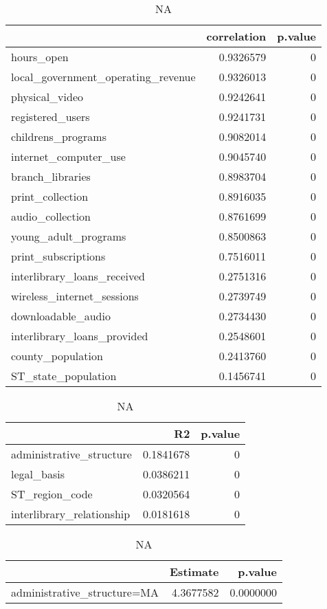 \documentclass[14pt,]{article}
\begin{document}
\begin{table}
\begin{table}
\caption{NA}

\centering
\begin{tabular}[t]{l|r|r}
\hline
  & correlation & p.value\\
\hline
hours\_open & 0.9326579 & 0\\
\hline
local\_government\_operating\_revenue & 0.9326013 & 0\\
\hline
physical\_video & 0.9242641 & 0\\
\hline
registered\_users & 0.9241731 & 0\\
\hline
childrens\_programs & 0.9082014 & 0\\
\hline
internet\_computer\_use & 0.9045740 & 0\\
\hline
branch\_libraries & 0.8983704 & 0\\
\hline
print\_collection & 0.8916035 & 0\\
\hline
audio\_collection & 0.8761699 & 0\\
\hline
young\_adult\_programs & 0.8500863 & 0\\
\hline
print\_subscriptions & 0.7516011 & 0\\
\hline
interlibrary\_loans\_received & 0.2751316 & 0\\
\hline
wireless\_internet\_sessions & 0.2739749 & 0\\
\hline
downloadable\_audio & 0.2734430 & 0\\
\hline
interlibrary\_loans\_provided & 0.2548601 & 0\\
\hline
county\_population & 0.2413760 & 0\\
\hline
ST\_state\_population & 0.1456741 & 0\\
\hline
\end{tabular}
\centering
\begin{tabular}[t]{l|r|r}
\hline
  & R2 & p.value\\
\hline
administrative\_structure & 0.1841678 & 0\\
\hline
legal\_basis & 0.0386211 & 0\\
\hline
ST\_region\_code & 0.0320564 & 0\\
\hline
interlibrary\_relationship & 0.0181618 & 0\\
\hline
\end{tabular}
\centering
\begin{tabular}[t]{l|r|r}
\hline
  & Estimate & p.value\\
\hline
administrative\_structure=MA & 4.3677582 & 0.0000000\\

\end{tabular}
\end{table}
\end{table}
\end{document}

